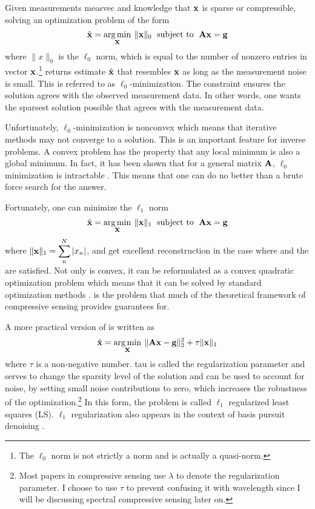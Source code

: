 Given measurements \gls{measvec} and knowledge that $\displaystyle \mathbf{x}$ is sparse or compressible, solving an optimization problem of the form 
\begin{equation}
	\hat{ \displaystyle \mathbf{x} } = \operatorname*{arg\,min}_{\displaystyle \mathbf{x}} \: \| \displaystyle \mathbf{x} \|_{0} \text{\; subject to \;} \displaystyle \mathbf{A}\displaystyle \mathbf{x} = \displaystyle \mathbf{g}
	\label{eq:l0min}
\end{equation}
where $\| x \|_{0}$ is the $\ell_0$ norm, which is equal to the number of nonzero entries in vector $\displaystyle \mathbf{x}$.\footnote{The $\ell_0$ norm is not strictly a norm and is actually a quasi-norm.}  returns estimate $\hat{ \displaystyle \mathbf{x} }$ that resembles $\displaystyle \mathbf{x}$ as long as the measurement noise is small. This is referred to as $\ell_0$-minimization. The constraint ensures the solution agrees with the observed measurement data. In other words, one wants the sparsest solution possible that agrees with the measurement data. 

Unfortunately, $\ell_0$-minimization is nonconvex which means that iterative methods may not converge to a solution. This is an important feature for inverse problems. A convex problem has the property that any local minimum is also a global minimum. In fact, it has been shown that for a general matrix $\displaystyle \mathbf{A}$, $\ell_0$ minimization is intractable \cite{aggarwal2007data}. This means that one can do no better than a brute force search for the answer.

Fortunately, one can minimize the $\ell_1$ norm 
\begin{equation}
	\hat{ \displaystyle \mathbf{x} } = \operatorname*{arg\,min}_{\displaystyle \mathbf{x}} \: \| \displaystyle \mathbf{x} \|_{1} \text{\; subject to \;} \displaystyle \mathbf{A}\displaystyle \mathbf{x} = \displaystyle \mathbf{g}
	\label{eq:l1min}
\end{equation}
where $\| \displaystyle \mathbf{x} \|_1 = \sum_{n}^{N}|x_n|$, and get excellent reconstruction in the case where  and the  are satisfied. Not only is  convex, it can be reformulated as a convex quadratic optimization problem which means that it can be solved by standard optimization methods \cite{donoho2006compressed, candes2006robust, foucart2013mathematical}.  is the problem that much of the theoretical framework of \gls{compressive sensing} provides guarantees for. 

A more practical version of  is written as
%
\begin{equation}
	\hat{ \displaystyle \mathbf{x} } = \operatorname*{arg\,min}_{\displaystyle \mathbf{x}} \: \| \displaystyle \mathbf{Ax} - \displaystyle \mathbf{g} \|_{2}^{2} + \tau \| \displaystyle \mathbf{x} \|_1
	\label{eq:l1regls}
\end{equation}
%
where $\tau$ is a non-negative number. \gls{tau} is called the regularization parameter and serves to change the sparsity level of the solution and can be used to account for noise, by setting small noise contributions to zero, which increases the robustness of the optimization.\footnote{Most papers in compressive sensing use $\lambda$ to denote the regularization parameter. I choose to use $\tau$ to prevent confusing it with wavelength since I will be discussing spectral compressive sensing later on.} In this form, the problem is called $\ell_1$ regularized least squares (LS). $\ell_1$ regularization also appears in the context of basis pursuit denoising \cite{chen2001atomic}. 

